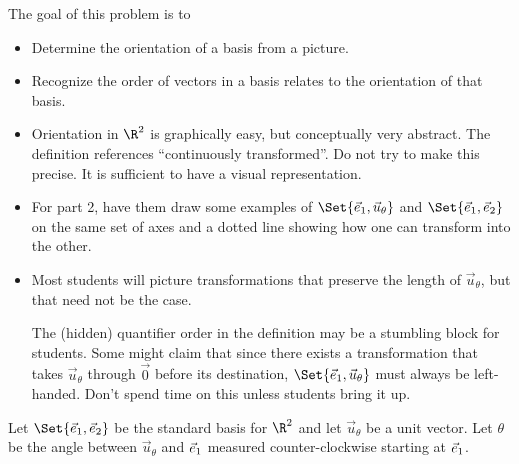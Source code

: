 \documentclass{problemset}
\begin{document}
	\question
	\begin{annotation}
		\begin{goals}

			The goal of this problem is to
			\begin{itemize}
				\item Determine the orientation of a basis from a  picture.
				\item Recognize the order of vectors in a basis relates to the
					orientation of that basis.
			\end{itemize}
		\end{goals}

		\begin{notes}
			\begin{itemize}
				\item Orientation in $\R^2$ is graphically easy, but conceptually very abstract.
					The definition references ``continuously transformed''. Do not try
					to make this precise. It is sufficient to have a visual representation.
				\item For part 2, have them draw some examples of $\Set{\xhat, \vec u_\theta}$
					and $\Set{\xhat, \yhat}$ on the same set of axes and a dotted line
					showing how one can transform into the other.
				\item Most students will picture transformations that preserve the length of $\vec u_\theta$,
					but that need not be the case.

					The (hidden) quantifier order in the definition may be a stumbling block for students. Some might
					claim that since there exists a transformation that takes $\vec u_\theta$ through $\vec 0$
					before its destination, $\Set{\xhat,\vec u_\theta}$ must always be left-handed.
					Don't spend time on this unless students bring it up.
			\end{itemize}
		\end{notes}
	\end{annotation}
	Let $\Set{\xhat,\yhat}$ be the standard basis for $\R^2$ and let
	$\vec u_{\theta}$ be a unit vector. Let $\theta$ be the angle between $\vec u_{\theta}$ and
	${\vec e_1}$ measured counter-clockwise starting at ${\vec e_1}$.
\end{document}
